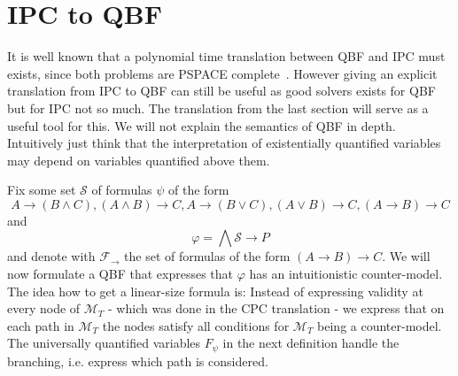 \documentclass[a4paper,UKenglish,cleveref, autoref, thm-restate]{lipics-v2021}
\begin{document}
\section{IPC to QBF}

It is well known that a polynomial time translation between QBF and IPC must exists, since both problems are PSPACE complete~\cite{garey1979computers, statman1979intuitionistic}. However giving an explicit translation from IPC to QBF can still be useful as good solvers exists for QBF but for IPC not so much. The translation from the last section will serve as a useful tool for this. We will not explain the semantics of QBF in depth. Intuitively just think that the interpretation of existentially quantified variables may depend on variables quantified above them.

Fix some set $\mathcal S$ of formulas $\psi$ of the form $$A\to (B\wedge C), (A\wedge B)\to C, A\to (B\vee C), (A\vee B)\to C, (A\to B)\to C$$and$$\varphi = \bigwedge \mathcal S\to P$$
and denote with $\mathcal F_\to$ the set of formulas of the form $(A\to B)\to C$. We will now formulate a QBF that expresses that $\varphi$ has an intuitionistic counter-model. The idea how to get a linear-size formula is: Instead of expressing validity at every node of $\mathcal M_T$ - which was done in the CPC translation - we express that on each path in $\mathcal M_T$ the nodes satisfy all conditions for $\mathcal M_T$ being a counter-model. The universally quantified variables $F_\psi$ in the next definition handle the branching, i.e. express which path is considered.
\end{document}
